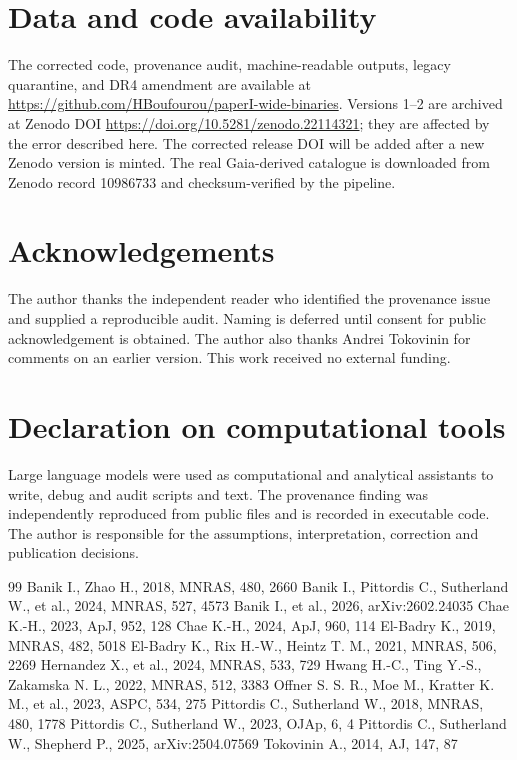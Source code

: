 \section*{Data and code availability}
The corrected code, provenance audit, machine-readable outputs, legacy
quarantine, and DR4 amendment are available at
\url{https://github.com/HBoufourou/paperI-wide-binaries}.  Versions 1--2 are
archived at Zenodo DOI \url{https://doi.org/10.5281/zenodo.22114321}; they are
affected by the error described here.  The corrected release DOI will be added
after a new Zenodo version is minted.  The real Gaia-derived catalogue is
downloaded from Zenodo record 10986733 and checksum-verified by the pipeline.

\section*{Acknowledgements}
The author thanks the independent reader who identified the provenance issue
and supplied a reproducible audit.  Naming is deferred until consent for public
acknowledgement is obtained.  The author also thanks Andrei Tokovinin for
comments on an earlier version.  This work received no external funding.

\section*{Declaration on computational tools}
Large language models were used as computational and analytical assistants to
write, debug and audit scripts and text.  The provenance finding was
independently reproduced from public files and is recorded in executable code.
The author is responsible for the assumptions, interpretation, correction and
publication decisions.

\begin{thebibliography}{99}
 Banik I., Zhao H., 2018, MNRAS, 480, 2660
 Banik I., Pittordis C., Sutherland W., et al., 2024, MNRAS, 527, 4573
 Banik I., et al., 2026, arXiv:2602.24035
 Chae K.-H., 2023, ApJ, 952, 128
 Chae K.-H., 2024, ApJ, 960, 114
 El-Badry K., 2019, MNRAS, 482, 5018
 El-Badry K., Rix H.-W., Heintz T. M., 2021, MNRAS, 506, 2269
 Hernandez X., et al., 2024, MNRAS, 533, 729
 Hwang H.-C., Ting Y.-S., Zakamska N. L., 2022, MNRAS, 512, 3383
 Offner S. S. R., Moe M., Kratter K. M., et al., 2023, ASPC, 534, 275
 Pittordis C., Sutherland W., 2018, MNRAS, 480, 1778
 Pittordis C., Sutherland W., 2023, OJAp, 6, 4
 Pittordis C., Sutherland W., Shepherd P., 2025, arXiv:2504.07569
 Tokovinin A., 2014, AJ, 147, 87
\end{thebibliography}
